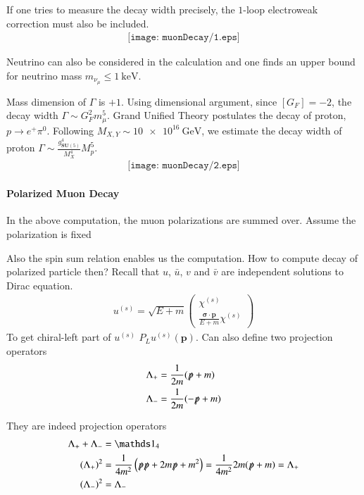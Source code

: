 If one tries to measure the decay width precisely, the $1$-loop electroweak correction must also be included.
\begin{align*}
   \texttt{[image: muonDecay/1.eps]}
\end{align*}

Neutrino can also be considered in the calculation and one finds an upper bound for neutrino mass $m_{\nu_\mu} \leq \SI{1}{\kilo \eV}$.

Mass dimension of $\Gamma$ is $+1$. Using dimensional argument, since $[G_F] = -2$, the decay width $\Gamma \sim G_F^2 m_\mu^5$. Grand Unified Theory postulates the decay of proton, $p \rightarrow e^+ \pi^0$. Following $M_{X,Y} \sim \SI{10e16}{\giga \eV}$, we estimate the decay width of proton $\Gamma \sim \frac{g_{\mathbf{SU}(5)}^4}{M_X^4} M^5_{p}$.
\begin{align*}
   \texttt{[image: muonDecay/2.eps]}
\end{align*}

\paragraph{Polarized Muon Decay}
In the above computation, the muon polarizations are summed over. Assume the polarization is fixed

Also the spin sum relation enables us the computation. How to compute decay of polarized particle then? Recall that $u$, $\bar{u}$, $v$ and $\bar{v}$ are independent solutions to Dirac equation.
\begin{align}
   u^{(s)} = \sqrt{E+m} \begin{pmatrix} \chi^{(s)} \\ \frac{\pmb{\sigma} \cdot \pmb{p}}{E+m} \chi^{(s)} \end{pmatrix}
\end{align}
To get chiral-left part of $u^{(s)}$ $P_L u^{(s)}(\pmb{p})$. Can also define two projection operators
\begin{align}
   \Lambda_+ &= \frac{1}{2m} (\slashed{p} + m) \\
   \Lambda_- &= \frac{1}{2m} (-\slashed{p} + m)
\end{align}

They are indeed projection operators
\begin{align*}
   \Lambda_+ + \Lambda_- &= \id_4 \\
   (\Lambda_+)^2 &= \frac{1}{4m^2} \left( \slashed{p} \slashed{p} + 2m \slashed{p} + m^2 \right) = \frac{1}{4m^2} 2m (\slashed{p} + m) = \Lambda_+ \\
   (\Lambda_-)^2 &= \Lambda_-
\end{align*}

